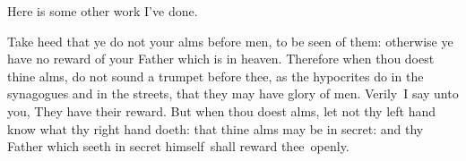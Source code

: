 \documentclass{grattanAlpha}
\begin{document}
Here is some other work I've done.

Take heed that ye do not your alms before men, to be seen of them: otherwise ye have no reward of your Father which is in heaven. Therefore when thou doest thine alms, do not sound a trumpet before thee, as the hypocrites do in the synagogues and in the streets, that they may have glory of men. Verily~I say unto you, They have their reward.  But when thou doest alms, let not thy left hand know what thy right hand doeth: that thine alms may be in secret: and thy Father which seeth in secret himself~shall reward thee~openly.
\end{document}
